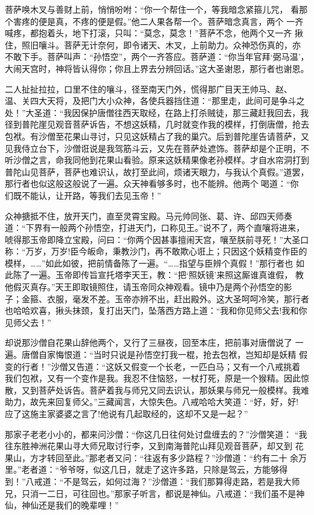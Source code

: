 菩萨唤木叉与善财上前，悄悄吩咐：“你一个帮住一个，等我暗念紧箍儿咒，
看那个害疼的便是真，不疼的便是假。”他二人果各帮一个。菩萨暗念真言，两个
一齐喊疼，都抱着头，地下打滚，只叫：“莫念，莫念！”菩萨不念，他两个又一齐
揪住，照旧嚷斗。菩萨无计奈何，即令诸天、木叉，上前助力。众神恐伤真的，亦
不敢下手。菩萨叫声：“孙悟空”，两个一齐答应。菩萨道：“你当年官拜‘弼马温’，
大闹天宫时，神将皆认得你；你且上界去分辨回话。”这大圣谢恩，那行者也谢恩。

二人扯扯拉拉，口里不住的嚷斗，径至南天门外，慌得那广目天王帅马、赵、
温、关四大天将，及把门大小众神，各使兵器挡住道：“那里走，此间可是争斗之
处！”大圣道：“我因保护唐僧往西天取经，在路上打杀贼徒，那三藏赶我回去，我
径到普陀崖见观音菩萨诉告，不想这妖精，几时就变作我的模样，打倒唐僧，抢去
包袱。有沙僧至花果山寻讨，只见这妖精占了我的巢穴。后到普陀崖告请菩萨，又
见我侍立台下，沙僧诳说是我驾筋斗云，又先在菩萨处遮饰。菩萨却是个正明，不
听沙僧之言，命我同他到花果山看验。原来这妖精果像老孙模样。才自水帘洞打到
普陀山见菩萨，菩萨也难识认，故打至此间，烦诸天眼力，与我认个真假。”道罢，
那行者也似这般这般说了一遍。众天神看够多时，也不能辨。他两个喝道：“你
们既不能认，让开路，等我们去见玉帝！”

众神搪抵不住，放开天门，直至灵霄宝殿。马元帅同张、葛、许、邱四天师奏
道：“下界有一般两个孙悟空，打进天门，口称见王。”说不了，两个直嚷将进来，
唬得那玉帝即降立宝殿，问曰：“你两个因甚事擅闹天宫，嚷至朕前寻死！”大圣口
称：“万岁，万岁!臣今皈命，秉教沙门，再不敢欺心诳上；只因这个妖精变作臣的
模样，……”如此如彼，把前情备陈了一遍。“……指望与臣辨个真假！”那行者也
如此陈了一遍。玉帝即传旨宣托塔李天王，教：“把‘照妖镜’来照这厮谁真谁假，
教他假灭真存。”天王即取镜照住，请玉帝同众神观看。镜中乃是两个孙悟空的影
子；金箍、衣服，毫发不差。玉帝亦辨不出，赶出殿外。这大圣呵呵冷笑，那行者
也哈哈欢喜，揪头抹颈，复打出天门，坠落西方路上道：“我和你见师父去!我和你
见师父去！”

却说那沙僧自花果山辞他两个，又行了三昼夜，回至本庄，把前事对唐僧说了
一遍。唐僧自家悔恨道：“当时只说是孙悟空打我一棍，抢去包袱，岂知却是妖精
假变的行者！”沙僧又告道：“这妖又假变一个长老，一匹白马；又有一个八戒挑着
我们包袱，又有一个变作是我。我忍不住恼怒，一杖打死，原是一个猴精。因此惊
散，又到菩萨处诉告。菩萨着我与师兄又同去识认，那妖果与师兄一般模样。我难
助力，故先来回复师父。”三藏闻言，大惊失色。八戒哈哈大笑道：“好，好，好!
应了这施主家婆婆之言了!他说有几起取经的，这却不又是一起？”

那家子老老小小的，都来问沙僧：“你这几日往何处讨盘缠去的？”沙僧笑道：
“我往东胜神洲花果山寻大师兄取讨行李，又到南海普陀山拜见观音菩萨，却又到
花果山，方才转回至此。”那老者又问：“往返有多少路程？”沙僧道：“约有二十
余万里。”老者道：“爷爷呀，似这几日，就走了这许多路，只除是驾云，方能够得
到！”八戒道：“不是驾云，如何过海？”沙僧道：“我们那算得走路，若是我大师
兄，只消一二日，可往回也。”那家子听言，都说是神仙。八戒道：“我们虽不是神
仙，神仙还是我们的晚辈哩！”

